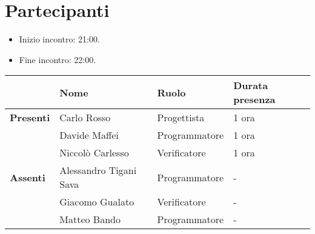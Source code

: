 \section*{Partecipanti}

\begin{itemize}
	\item Inizio incontro: 21:00.
	\item Fine incontro: 22:00.
\end{itemize}


\begin{center}
	\begin{tabular}{llll}
		                  & \textbf{Nome}			& \textbf{Ruolo}	& \textbf{Durata presenza}	\\
		\hline
		\textbf{Presenti} & Carlo Rosso				& Progettista		& 1 ora 		            \\
		                  & Davide Maffei          	& Programmatore		& 1 ora 		            \\
		                  & Niccolò Carlesso       	& Verificatore		& 1 ora 		            \\
		\hline
		\textbf{Assenti}  & Alessandro Tigani Sava 	& Programmatore		& -							\\
						  & Giacomo Gualato         & Verificatore		& -							\\
						  & Matteo Bando			& Programmatore		& -							\\
	\end{tabular}
\end{center}
